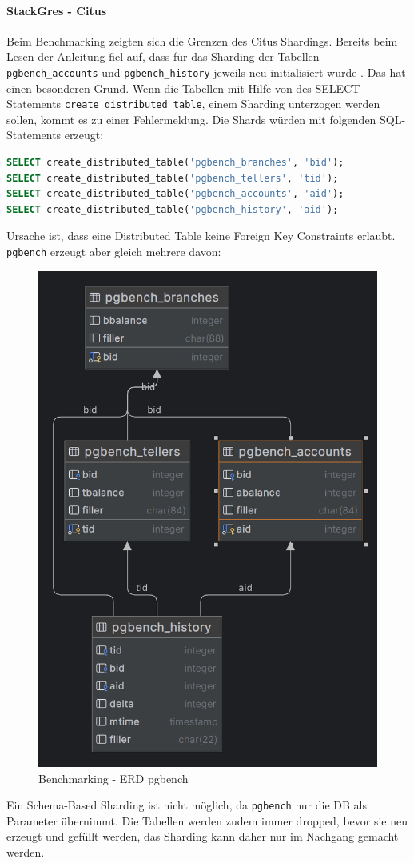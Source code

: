 \begin{flushleft}
    \paragraph{StackGres - Citus}
    Beim Benchmarking zeigten sich die Grenzen des Citus Shardings.
    Bereits beim Lesen der Anleitung fiel auf, dass für das Sharding der Tabellen \texttt{pgbench\_accounts} und \texttt{pgbench\_history} jeweils neu initialisiert wurde \cite{6CJFR7RM}.
    Das hat einen besonderen Grund.
    Wenn die Tabellen mit Hilfe von des SELECT-Statements \texttt{create\_distributed\_table}, einem Sharding unterzogen werden sollen, kommt es zu einer Fehlermeldung.
    Die Shards würden mit folgenden SQL-Statements erzeugt:
\lstset{style=gra_codestyle}
\begin{lstlisting}[language=sql, caption=Citus - Benchmarking - Distributed Table Sharding,captionpos=b,label={lst:benchmarking_distributed_table_sharding},breaklines=true]
SELECT create_distributed_table('pgbench_branches', 'bid');
SELECT create_distributed_table('pgbench_tellers', 'tid');
SELECT create_distributed_table('pgbench_accounts', 'aid');
SELECT create_distributed_table('pgbench_history', 'aid');
\end{lstlisting}
    \clearpage
    Ursache ist, dass eine Distributed Table keine Foreign Key Constraints erlaubt.
    \texttt{pgbench} erzeugt aber gleich mehrere davon:
    \begin{figure}[H]
        \centering
        \includegraphics[width=0.5\linewidth]{source/implementation/evaluation/benchmarking/stackgres_citus/pgbench_accounts}
        \caption{Benchmarking - ERD pgbench}
        \label{fig:pgbench_accounts}
    \end{figure}
    Ein Schema-Based Sharding ist nicht möglich, da \texttt{pgbench} nur die DB als Parameter übernimmt.
    Die Tabellen werden zudem immer dropped, bevor sie neu erzeugt und gefüllt werden, das Sharding kann daher nur im Nachgang gemacht werden.
\end{flushleft}
